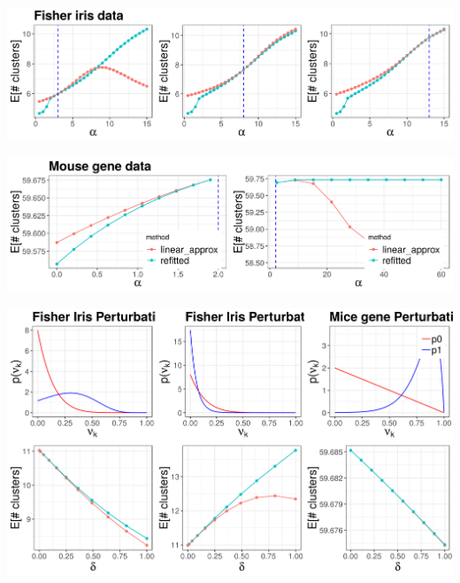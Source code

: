 \documentclass[a0,plainsections,30pt]{sciposter}\usepackage[]{graphicx}\usepackage[]{color}
\newenvironment{knitrout}{}{} %
\begin{document}
\begin{minipage}[t]{0.45\textwidth}
\begin{knitrout}
\color{fgcolor}

{\centering \includegraphics[width=0.98\linewidth,height=0.294\linewidth]{figure/param_sens_plot-1} 

}



\end{knitrout}

\begin{knitrout}
\color{fgcolor}

{\centering \includegraphics[width=0.98\linewidth,height=0.294\linewidth]{figure/gene_param_sens_plot-1} 

}



\end{knitrout}

\vspace{0.1in}

\begin{knitrout}
\color{fgcolor}

{\centering \includegraphics[width=0.98\linewidth,height=0.588\linewidth]{figure/functional_sens_plot-1} 

}
\end{knitrout}
\end{minipage}
\end{document}
